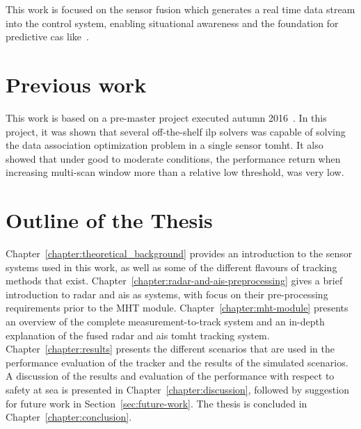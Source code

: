 This work is focused on the sensor fusion which generates a real time data stream into the control system, enabling situational awareness and the foundation for predictive \gls{cas} like~\cite{Hagen2017}.

\section{Previous work}\label{sec:previous_work}
This work is based on a pre-master project executed autumn 2016~\cite{Liland_2017}. In this project, it was shown that several off-the-shelf \gls{ilp} \glspl{solver} was capable of solving the data association optimization problem in a single sensor \gls{tomht}. It also showed that under good to moderate conditions, the performance return when increasing multi-scan window more than a relative low threshold, was very low.

\section{Outline of the Thesis}\label{sec:outline_thesis}
Chapter~\ref{chapter:theoretical_background} provides an introduction to the sensor systems used in this work, as well as some of the different flavours of tracking methods that exist. Chapter~\ref{chapter:radar-and-ais-preprocessing} gives a brief introduction to radar and \gls{ais} as systems, with focus on their pre-processing requirements prior to the MHT module. Chapter~\ref{chapter:mht-module} presents an overview of the complete measurement-to-track system and an in-depth explanation of the fused \gls{radar} and \gls{ais} \gls{tomht} tracking system. Chapter~\ref{chapter:results} presents the different scenarios that are used in the performance evaluation of the tracker and the results of the simulated scenarios. A discussion of the results and evaluation of the performance with respect to safety at sea is presented in Chapter~\ref{chapter:discussion}, followed by suggestion for future work in Section~\ref{sec:future-work}. The thesis is concluded in Chapter~\ref{chapter:conclusion}.